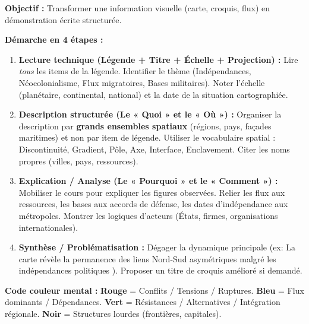 \documentclass[11pt]{article}
\newcommand{\cle}[1]{{\popxbold\color{popdark}#1}}
\begin{document}
\begin{methode}
\textbf{Objectif :} Transformer une information visuelle (carte, croquis, flux) en démonstration écrite structurée.
\par \textbf{Démarche en 4 étapes :}
\begin{enumerate}
    \item \textbf{Lecture technique (Légende + Titre + Échelle + Projection) :} Lire \emph{tous} les items de la légende. Identifier le thème (Indépendances, Néocolonialisme, Flux migratoires, Bases militaires). Noter l'échelle (planétaire, continental, national) et la date de la situation cartographiée.
    \item \textbf{Description structurée (Le « Quoi » et le « Où ») :} Organiser la description par \textbf{grands ensembles spatiaux} (régions, pays, façades maritimes) et non par item de légende. Utiliser le vocabulaire spatial : \cle{Discontinuité}, \cle{Gradient}, \cle{Pôle}, \cle{Axe}, \cle{Interface}, \cle{Enclavement}. Citer les noms propres (villes, pays, ressources).
    \item \textbf{Explication / Analyse (Le « Pourquoi » et le « Comment ») :} Mobiliser le cours pour expliquer les figures observées. Relier les flux aux ressources, les bases aux accords de défense, les dates d'indépendance aux métropoles. Montrer les \cle{logiques d'acteurs} (États, firmes, organisations internationales).
    \item \textbf{Synthèse / Problématisation :} Dégager la dynamique principale (ex: \guillemotleft La carte révèle la permanence des liens Nord-Sud asymétriques malgré les indépendances politiques \guillemotright). Proposer un titre de croquis amélioré si demandé.
\end{enumerate}
\par \textbf{Code couleur mental :} \textbf{Rouge} = Conflits / Tensions / Ruptures. \textbf{Bleu} = Flux dominants / Dépendances. \textbf{Vert} = Résistances / Alternatives / Intégration régionale. \textbf{Noir} = Structures lourdes (frontières, capitales).
\end{methode}
\end{document}
